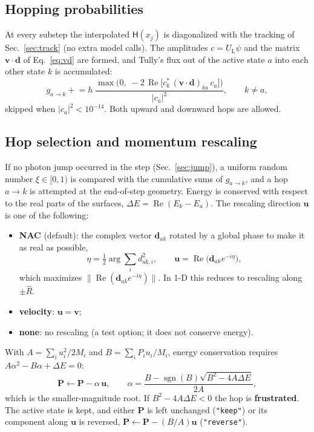 \documentclass[11pt]{article}
\newcommand{\Pv}{\mathbf{P}}
\newcommand{\vv}{\mathbf{v}}
\newcommand{\dd}{\mathbf{d}}
\newcommand{\UL}{U_{\mathrm L}}
\newcommand{\Hm}{\mathsf{H}}
\newcommand{\Rep}{\operatorname{Re}}
\newcommand{\code}[1]{\texttt{#1}}
\begin{document}
\subsection{Hopping probabilities}
At every substep the interpolated $\Hm(x_j)$ is diagonalized with the tracking of Sec.~\ref{sec:track} (no extra model calls). The amplitudes $c=\UL\psi$ and the matrix $\vv\cdot\dd$ of Eq.~\eqref{eq:vd} are formed, and Tully's flux out of the active state $a$ into each other state $k$ is accumulated:
\begin{equation}
g_{a\to k}\mathrel{+}=h\;\frac{\max\!\big(0,\;-2\,\Rep\big[c_k^*\,(\vv\cdot\dd)_{ka}\,c_a\big]\big)}{|c_a|^2},\qquad k\neq a,
\label{eq:tully}
\end{equation}
skipped when $|c_a|^2<10^{-14}$. Both upward and downward hops are allowed.

\subsection{Hop selection and momentum rescaling}
If no photon jump occurred in the step (Sec.~\ref{sec:jump}), a uniform random number $\xi\in[0,1)$ is compared with the cumulative sums of $g_{a\to k}$, and a hop $a\to k$ is attempted at the end-of-step geometry. Energy is conserved with respect to the real parts of the surfaces, $\Delta E=\Rep(E_k-E_a)$. The rescaling direction $\mathbf u$ is one of the following:
\begin{itemize}
\item \textbf{NAC} (default): the complex vector $\dd_{ak}$ rotated by a global phase to make it as real as possible,
\begin{equation}
\eta=\tfrac12\arg\sum_i d_{ak,i}^2,\qquad \mathbf u=\Rep\big(\dd_{ak}e^{-i\eta}\big),
\end{equation}
which maximizes $\|\Rep(\dd_{ak}e^{-i\eta})\|$. In 1-D this reduces to rescaling along $\pm\hat R$.
\item \textbf{velocity}: $\mathbf u=\vv$;
\item \textbf{none}: no rescaling (a test option; it does not conserve energy).
\end{itemize}
With $A=\sum_iu_i^2/2M_i$ and $B=\sum_iP_iu_i/M_i$, energy conservation requires $A\alpha^2-B\alpha+\Delta E=0$:
\begin{equation}
\Pv\leftarrow\Pv-\alpha\,\mathbf u,\qquad
\alpha=\frac{B-\operatorname{sgn}(B)\sqrt{B^2-4A\Delta E}}{2A},
\end{equation}
which is the smaller-magnitude root. If $B^2-4A\Delta E<0$ the hop is \textbf{frustrated}. The active state is kept, and either $\Pv$ is left unchanged (\code{"keep"}) or its component along $\mathbf u$ is reversed, $\Pv\leftarrow\Pv-(B/A)\mathbf u$ (\code{"reverse"}).
\end{document}
